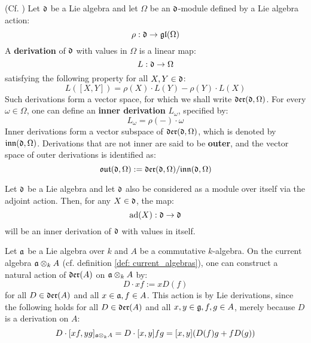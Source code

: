         \begin{definition} \label{def: lie_derivations}
            (Cf. \cite[Section VII.2, Equation 2.2, p. 234]{hilton_stammbach_homological_algebra}) Let $\mathfrak{d}$ be a Lie algebra and let $\Omega$ be an $\mathfrak{d}$-module defined by a Lie algebra action:
                $$\rho: \mathfrak{d} \to \mathfrak{gl}(\Omega)$$
            A \textbf{derivation} of $\mathfrak{d}$ with values in $\Omega$ is a linear map:
                $$L: \mathfrak{d} \to \Omega$$
            satisfying the following property for all $X, Y \in \mathfrak{d}$:
                $$L( [X, Y] ) = \rho(X) \cdot L(Y) - \rho(Y) \cdot L(X)$$
            Such derivations form a vector space, for which we shall write $\mathfrak{der}(\mathfrak{d}, \Omega)$. For every $\omega \in \Omega$, one can define an \textbf{inner derivation} $L_{\omega}$, specified by:
                $$L_{\omega} = \rho(-) \cdot \omega$$
            Inner derivations form a vector subspace of $\mathfrak{der}(\mathfrak{d}, \Omega)$, which is denoted by $\mathfrak{inn}(\mathfrak{d}, \Omega)$. Derivations that are not inner are said to be \textbf{outer}, and the vector space of outer derivations is identified as:
                $$\mathfrak{out}(\mathfrak{d}, \Omega) := \mathfrak{der}(\mathfrak{d}, \Omega)/\mathfrak{inn}(\mathfrak{d}, \Omega)$$
        \end{definition}
        \begin{example}
            Let $\mathfrak{d}$ be a Lie algebra and let $\mathfrak{d}$ also be considered as a module over itself via the adjoint action. Then, for any $X \in \mathfrak{d}$, the map:
                $$\mathrm{ad}(X): \mathfrak{d} \to \mathfrak{d}$$
            will be an inner derivation of $\mathfrak{d}$ with values in itself.
        \end{example}
        \begin{example} \label{example: derivations_on_current_algebras}
            Let $\mathfrak{a}$ be a Lie algebra over $k$ and $A$ be a commutative $k$-algebra. On the current algebra $\a \tensor_k A$ (cf. definition \ref{def: current_algebras}), one can construct a natural action of $\mathfrak{der}(A)$ on $\a \tensor_k A$ by:
                $$D \cdot xf := x D(f)$$
            for all $D \in \mathfrak{der}(A)$ and all $x \in \mathfrak{a}, f \in A$. This action is by Lie derivations, since the following holds for all $D \in \mathfrak{der}(A)$ and all $x, y \in \mathfrak{g}, f, g \in A$, merely because $D$ is a derivation on $A$:
                $$D \cdot [xf, yg]_{\a \tensor_k A} = D \cdot [x, y] fg = [x, y] ( D(f)g + f D(g) )$$
        \end{example}

